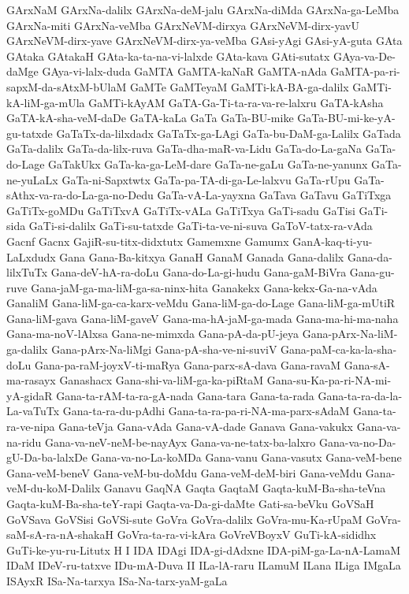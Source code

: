 {GArxNaM
GArxNa-dalilx
GArxNa-deM-jalu
GArxNa-diMda
GArxNa-ga-LeMba
GArxNa-miti
GArxNa-veMba
GArxNeVM-dirxya
GArxNeVM-dirx-yavU
GArxNeVM-dirx-yave
GArxNeVM-dirx-ya-veMba
GAsi-yAgi
GAsi-yA-guta
GAta
GAtaka
GAtakaH
GAta-ka-ta-na-vi-lalxde
GAta-kava
GAti-sutatx
GAya-va-De-daMge
GAya-vi-lalx-duda
GaMTA
GaMTA-kaNaR
GaMTA-nAda
GaMTA-pa-ri-sapxM-da-sAtxM-bUlaM
GaMTe
GaMTeyaM
GaMTi-kA-BA-ga-dalilx
GaMTi-kA-liM-ga-mUla
GaMTi-kAyAM
GaTA-Ga-Ti-ta-ra-va-re-lalxru
GaTA-kAsha
GaTA-kA-sha-veM-daDe
GaTA-kaLa
GaTa
GaTa-BU-mike
GaTa-BU-mi-ke-yA-gu-tatxde
GaTaTx-da-lilxdadx
GaTaTx-ga-LAgi
GaTa-bu-DaM-ga-Lalilx
GaTada
GaTa-dalilx
GaTa-da-lilx-ruva
GaTa-dha-maR-va-Lidu
GaTa-do-La-gaNa
GaTa-do-Lage
GaTakUkx
GaTa-ka-ga-LeM-dare
GaTa-ne-gaLu
GaTa-ne-yanunx
GaTa-ne-yuLaLx
GaTa-ni-Sapxtwtx
GaTa-pa-TA-di-ga-Le-lalxvu
GaTa-rUpu
GaTa-sAthx-va-ra-do-La-ga-no-Dedu
GaTa-vA-La-yayxna
GaTava
GaTavu
GaTiTxga
GaTiTx-goMDu
GaTiTxvA
GaTiTx-vALa
GaTiTxya
GaTi-sadu
GaTisi
GaTi-sida
GaTi-si-dalilx
GaTi-su-tatxde
GaTi-ta-ve-ni-suva
GaToV-tatx-ra-vAda
Gacnf
Gacnx
GajiR-su-titx-didxtutx
Gamemxne
Gamumx
GanA-kaq-ti-yu-LaLxdudx
Gana
Gana-Ba-kitxya
GanaH
GanaM
Ganada
Gana-dalilx
Gana-da-lilxTuTx
Gana-deV-hA-ra-doLu
Gana-do-La-gi-hudu
Gana-gaM-BiVra
Gana-gu-ruve
Gana-jaM-ga-ma-liM-ga-sa-ninx-hita
Ganakekx
Gana-kekx-Ga-na-vAda
GanaliM
Gana-liM-ga-ca-karx-veMdu
Gana-liM-ga-do-Lage
Gana-liM-ga-mUtiR
Gana-liM-gava
Gana-liM-gaveV
Gana-ma-hA-jaM-ga-mada
Gana-ma-hi-ma-naha
Gana-ma-noV-lAlxsa
Gana-ne-mimxda
Gana-pA-da-pU-jeya
Gana-pArx-Na-liM-ga-dalilx
Gana-pArx-Na-liMgi
Gana-pA-sha-ve-ni-suviV
Gana-paM-ca-ka-la-sha-doLu
Gana-pa-raM-joyxV-ti-maRya
Gana-parx-sA-dava
Gana-ravaM
Gana-sA-ma-rasayx
Ganashacx
Gana-shi-va-liM-ga-ka-piRtaM
Gana-su-Ka-pa-ri-NA-mi-yA-gidaR
Gana-ta-rAM-ta-ra-gA-nada
Gana-tara
Gana-ta-rada
Gana-ta-ra-da-la-La-vaTuTx
Gana-ta-ra-du-pAdhi
Gana-ta-ra-pa-ri-NA-ma-parx-sAdaM
Gana-ta-ra-ve-nipa
Gana-teVja
Gana-vAda
Gana-vA-dade
Ganava
Gana-vakukx
Gana-va-na-ridu
Gana-va-neV-neM-be-nayAyx
Gana-va-ne-tatx-ba-lalxro
Gana-va-no-Da-gU-Da-ba-lalxDe
Gana-va-no-La-koMDa
Gana-vanu
Gana-vasutx
Gana-veM-bene
Gana-veM-beneV
Gana-veM-bu-doMdu
Gana-veM-deM-biri
Gana-veMdu
Gana-veM-du-koM-Dalilx
Ganavu
GaqNA
Gaqta
GaqtaM
Gaqta-kuM-Ba-sha-teVna
Gaqta-kuM-Ba-sha-teY-rapi
Gaqta-va-Da-gi-daMte
Gati-sa-beVku
GoVSaH
GoVSava
GoVSisi
GoVSi-sute
GoVra
GoVra-dalilx
GoVra-mu-Ka-rUpaM
GoVra-saM-sA-ra-nA-shakaH
GoVra-ta-ra-vi-kAra
GoVreVBoyxV
GuTi-kA-sididhx
GuTi-ke-yu-ru-Litutx
H
I
IDA
IDAgi
IDA-gi-dAdxne
IDA-piM-ga-La-nA-LamaM
IDaM
IDeV-ru-tatxve
IDu-mA-Duva
II
ILa-lA-raru
ILamuM
ILana
ILiga
IMgaLa
ISAyxR
ISa-Na-tarxya
ISa-Na-tarx-yaM-gaLa
}
